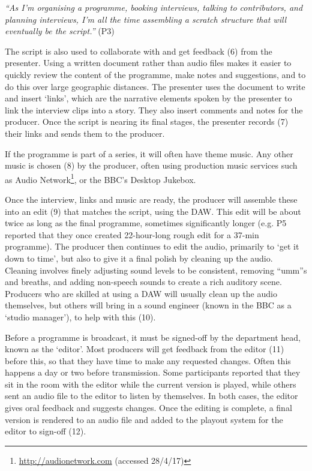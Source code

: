 \textit{``As I'm organising a programme, booking interviews, talking to contributors, and planning interviews, I'm all the time
assembling a scratch structure that will eventually be the script.''} (P3) %

The script is also used to collaborate with and get feedback (6) from the presenter.  Using a written document rather
than audio files makes it easier to quickly review the content of the programme, make notes and suggestions, and to do
this over large geographic distances. The presenter uses the document to write and insert `links', which are the
narrative elements spoken by the presenter to link the interview clips into a story. They also insert comments and
notes for the producer. Once the script is nearing its final stages, the presenter records (7) their links and sends
them to the producer.

If the programme is part of a series, it will often have theme music. Any other music is chosen (8) by the producer,
often using production music services such as Audio Network\footnote{\url{http://audionetwork.com} (accessed 28/4/17)},
or the BBC's Desktop Jukebox.

Once the interview, links and music are ready, the producer will assemble these into an edit (9) that matches the
script, using the DAW. This edit will be about twice as long as the final programme, sometimes significantly longer
(e.g. P5 reported that they once created 22-hour-long rough edit for a 37-min programme). The producer then continues
to edit the audio, primarily to `get it down to time', but also to give it a final polish by cleaning up the audio.
Cleaning involves finely adjusting sound levels to be consistent, removing ``umm''s and breaths, and adding non-speech
sounds to create a rich auditory scene.  Producers who are skilled at using a DAW will usually clean up the audio
themselves, but others will bring in a sound engineer (known in the BBC as a `studio manager'), to help with this (10).

Before a programme is broadcast, it must be signed-off by the department head, known as the `editor'. Most producers
will get feedback from the editor (11) before this, so that they have time to make any requested changes. Often this
happens a day or two before transmission. Some participants reported that they sit in the room with the editor while
the current version is played, while others sent an audio file to the editor to listen by themselves. In both cases,
the editor gives oral feedback and suggests changes.  Once the editing is complete, a final version is rendered to an
audio file and added to the playout system for the editor to sign-off (12).

